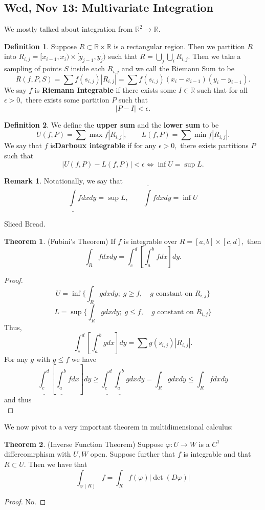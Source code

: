 \documentclass[10pt, oneside]{article}
\newcommand{\bbR}{\mathbb{R}}
\theoremstyle{definition}
\newtheorem{thm}{Theorem}
\newtheorem{defn}{Definition}
\newtheorem{rem}{Remark}
\begin{document}
\newpage
\subsection{Wed, Nov 13: Multivariate Integration}
We mostly talked about integration from $\bbR^2 \to \bbR.$ 
\begin{defn}
    Suppose $R\subset \bbR \times \bbR$ is a rectangular region. Then we partition $R$ into $R_{i,j} = [x_{i-1}, x_i) \times [y_{j-1}, y_j)$ such that $R = \bigcup_j\bigcup_i R_{i,j}.$ Then we take a sampling of points $S$ inside each $R_{i,j}$ and we call the Riemann Sum to be 
    \[R(f,P,S) = \sum f(s_{i,j})|R_{i,j}| = \sum f(s_{i,j})(x_i - x_{i-1})(y_{i} - y_{i-1}).\]
    We say $f$ is \textbf{Riemann Integrable} if there exists some $I \in \bbR$ such that for all $\epsilon>0,$ there exists some partition $P$ such that 
    \[|P-I|< \epsilon.\]
\end{defn}
\begin{defn}
    We define the \textbf{upper sum} and the \textbf{lower sum} to be 
    \[U(f,P) = \sum \max f |R_{i,j}|, \qquad L(f,P) = \sum \min f |R_{i,j}|.\] We say that $f$ is\textbf{Darboux integrable} if for any $\epsilon>0,$ there exists partitions $P$ such that 
    \[|U(f,P) - L(f,P)| < \epsilon \iff \inf U = \sup L.\]
\end{defn}
\begin{rem}
    Notationally, we say that \[\underline{\int}fdxdy = \sup L, \qquad \overline{\int}f dxdy = \inf U\]
\end{rem}
Sliced Bread.
\begin{thm}
    (Fubini's Theorem) If $f$ is integrable over $R = [a,b] \times [c,d],$ then 
    \[\int_R fdxdy = \int_c^d \left[\int_a^b f dx \right]dy.\]
\end{thm}
\begin{proof}
    \[U = \inf\{\int_R g dxdy; \; g\geq f, \quad \text{$g$ constant on $R_{i,j}$}\}\]
    \[L = \sup\{\int_R g dxdy;\;  g\leq f, \quad \text{$g$ constant on $R_{i,j}$}\}\]
Thus, 
\[\int_c^d \left[\int_a^b gdx\right]dy = \sum g(s_{i,j})|R_{i,j}|.\]
For any $g$ with $g\leq f$ we have
\[\underline{\int_c^d}\left[\underline{\int_a^b}fdx\right]dy \geq \underline{\int_c^d} \underline{\int_a^b} gdxdy = \int_R g dxdy \leq \int_R f dxdy\]
and thus 
\[\]
\end{proof}

We now pivot to a very important theorem in multidimensional calculus: 
\begin{thm} (Inverse Function Theorem)
    Suppose $\varphi: U \to W$ is a $C^1$ differeomrphism with $U,W$ open. Suppose further that $f$ is integrable and that $R \subset U.$ Then we have that 
    \[\int_{\varphi(R)}f = \int_R f(\varphi) |\det(D\varphi)|\]
\end{thm}
\begin{proof}
    No.
\end{proof}
\end{document}
